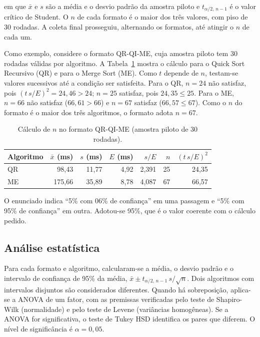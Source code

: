 \documentclass[12pt]{article}
\begin{document}
em que $\bar{x}$ e $s$ são a média e o desvio padrão da amostra piloto e
$t_{\alpha/2,\,n-1}$ é o valor crítico de Student. O $n$ de cada formato é o
maior dos três valores, com piso de 30 rodadas. A coleta final prosseguiu,
alternando os formatos, até atingir o $n$ de cada um.

Como exemplo, considere o formato QR-QI-ME, cuja amostra piloto tem 30 rodadas
válidas por algoritmo. A Tabela~\ref{tab:calculo} mostra o cálculo para o Quick
Sort Recursivo (QR) e para o Merge Sort (ME). Como $t$ depende de $n$, testam-se
valores sucessivos até a condição ser satisfeita. Para o QR, $n = 24$ não
satisfaz, pois $(t\,s/E)^2 = 24{,}46 > 24$; $n = 25$ satisfaz, pois
$24{,}35 \leq 25$. Para o ME, $n = 66$ não satisfaz ($66{,}61 > 66$) e $n = 67$
satisfaz ($66{,}57 \leq 67$). Como o $n$ do formato é o maior dos três
algoritmos, o formato adota $n = 67$.

\begin{table}[ht]
\centering
\caption{Cálculo de $n$ no formato QR-QI-ME (amostra piloto de 30 rodadas).}
\label{tab:calculo}
\footnotesize
\begin{tabular}{lrrrrrr}
\toprule
Algoritmo & $\bar{x}$ (ms) & $s$ (ms) & $E$ (ms) & $s/E$ & $n$ & $(t\,s/E)^2$ \\
\midrule
QR & 98,43 & 11,77 & 4,92 & 2,391 & 25 & 24,35 \\
ME & 175,66 & 35,89 & 8,78 & 4,087 & 67 & 66,57 \\
\bottomrule
\end{tabular}
\end{table}

O enunciado indica ``5\% com 06\% de confiança'' em uma passagem e ``5\% com
95\% de confiança'' em outra. Adotou-se 95\%, que é o valor coerente com o
cálculo pedido.

\subsection{Análise estatística}

Para cada formato e algoritmo, calcularam-se a média, o desvio padrão e o
intervalo de confiança de 95\% da média, $\bar{x} \pm t_{\alpha/2,\,n-1}\,s/\sqrt{n}$.
Dois algoritmos com intervalos disjuntos são considerados diferentes. Quando
há sobreposição, aplica-se a ANOVA de um fator, com as premissas verificadas
pelo teste de Shapiro-Wilk (normalidade) e pelo teste de Levene (variâncias
homogêneas). Se a ANOVA for significativa, o teste de Tukey HSD identifica os
pares que diferem. O nível de significância é $\alpha = 0{,}05$.
\end{document}
